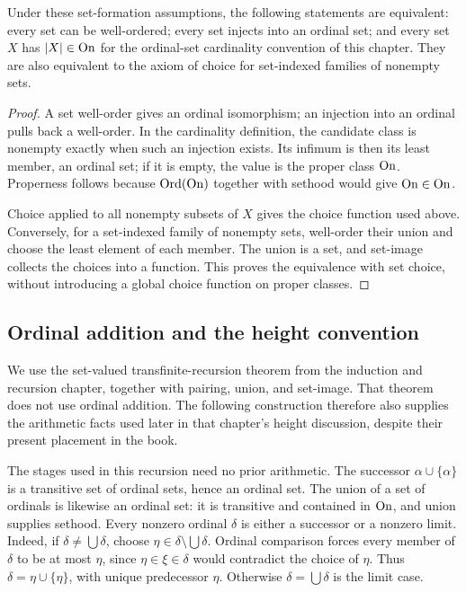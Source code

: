 \begin{corollary}
Under these set-formation assumptions, the following statements are
equivalent: every set can be well-ordered; every set injects into an
ordinal set; and every set $X$ has $|X|\in\mathrm{On}$ for the ordinal-set
cardinality convention of this chapter. They are also equivalent to the
axiom of choice for set-indexed families of nonempty sets.
\end{corollary}
\begin{proof}
A set well-order gives an ordinal isomorphism; an injection into an ordinal
pulls back a well-order. In the cardinality definition, the candidate
class is nonempty exactly when such an injection exists. Its infimum is
then its least member, an ordinal set; if it is empty, the value is the
proper class $\mathrm{On}$. Properness follows because $\mathrm{Ord}(\mathrm{On})$ together
with sethood would give $\mathrm{On}\in\mathrm{On}$.

Choice applied to all nonempty subsets of $X$ gives the choice function
used above. Conversely, for a set-indexed family of nonempty sets,
well-order their union and choose the least element of each member.
The union is a set, and set-image collects the choices into a function.
This proves the equivalence with set choice, without introducing a
global choice function on proper classes.
\end{proof}

\subsection{Ordinal addition and the height convention}
\label{sec:ordinal_addition}
We use the set-valued transfinite-recursion theorem from the induction
and recursion chapter, together with pairing, union, and set-image. That
theorem does not use ordinal addition. The following construction therefore
also supplies the arithmetic facts used later in that chapter's height
discussion, despite their present placement in the book.

The stages used in this recursion need no prior arithmetic. The successor
$\alpha\cup\{\alpha\}$ is a transitive set of ordinal sets, hence an
ordinal set. The union of a set of ordinals is likewise an ordinal set:
it is transitive and contained in $\mathrm{On}$, and union supplies sethood.
Every nonzero ordinal $\delta$ is either a successor or a nonzero limit.
Indeed, if $\delta\ne\bigcup\delta$, choose
$\eta\in\delta\setminus\bigcup\delta$. Ordinal comparison forces
every member of $\delta$ to be at most $\eta$, since $\eta\in\xi\in\delta$
would contradict the choice of $\eta$. Thus
$\delta=\eta\cup\{\eta\}$, with unique predecessor $\eta$.
Otherwise $\delta=\bigcup\delta$ is the limit case.

